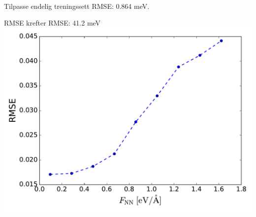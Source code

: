 \documentclass{beamer}
\begin{document}

\begin{frame}
 
\begin{block}{Tilpasse endelig treningssett}
 RMSE: 0.864 meV.
\end{block}

\begin{block}{RMSE krefter}
 \centering
 RMSE: 41.2 meV
 \includegraphics[width = 0.7\linewidth]{../Figures/Results/SiForces.pdf}
\end{block}

\end{frame}
\end{document}
